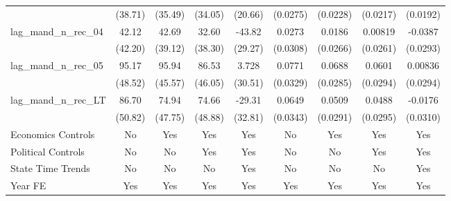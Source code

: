 {\begin{longtable}{l*{8}{c}}
                    &     (38.71)         &     (35.49)         &     (34.05)         &     (20.66)         &    (0.0275)         &    (0.0228)         &    (0.0217)         &    (0.0192)         \\
[1em]
lag\_mand\_n\_rec\_04   &       42.12         &       42.69         &       32.60         &      -43.82         &      0.0273         &      0.0186         &     0.00819         &     -0.0387         \\
                    &     (42.20)         &     (39.12)         &     (38.30)         &     (29.27)         &    (0.0308)         &    (0.0266)         &    (0.0261)         &    (0.0293)         \\
[1em]
lag\_mand\_n\_rec\_05   &       95.17\sym{*}  &       95.94\sym{**} &       86.53\sym{*}  &       3.728         &      0.0771\sym{**} &      0.0688\sym{**} &      0.0601\sym{**} &     0.00836         \\
                    &     (48.52)         &     (45.57)         &     (46.05)         &     (30.51)         &    (0.0329)         &    (0.0285)         &    (0.0294)         &    (0.0294)         \\
[1em]
lag\_mand\_n\_rec\_LT   &       86.70\sym{*}  &       74.94         &       74.66         &      -29.31         &      0.0649\sym{*}  &      0.0509\sym{*}  &      0.0488\sym{*}  &     -0.0176         \\
                    &     (50.82)         &     (47.75)         &     (48.88)         &     (32.81)         &    (0.0343)         &    (0.0291)         &    (0.0295)         &    (0.0310)         \\
[1em]
Economics Controls  &          No         &         Yes         &         Yes         &         Yes         &          No         &         Yes         &         Yes         &         Yes         \\
[1em]
Political Controls  &          No         &          No         &         Yes         &         Yes         &          No         &          No         &         Yes         &         Yes         \\
[1em]
State Time Trends   &          No         &          No         &          No         &         Yes         &          No         &          No         &          No         &         Yes         \\
[1em]
Year FE             &         Yes         &         Yes         &         Yes         &         Yes         &         Yes         &         Yes         &         Yes         &         Yes         \\

\end{longtable}}
